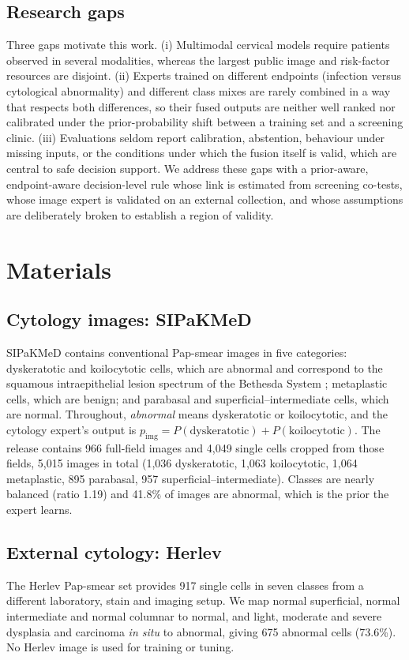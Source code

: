 \documentclass[lettersize,journal]{IEEEtran}
\newcommand{\pimg}{p_{\mathrm{img}}}
\begin{document}
\subsection{Research gaps}
Three gaps motivate this work. (i) Multimodal cervical models require patients observed in several modalities, whereas the largest public image and risk-factor resources are disjoint. (ii) Experts trained on different endpoints (infection versus cytological abnormality) and different class mixes are rarely combined in a way that respects both differences, so their fused outputs are neither well ranked nor calibrated under the prior-probability shift between a training set and a screening clinic. (iii) Evaluations seldom report calibration, abstention, behaviour under missing inputs, or the conditions under which the fusion itself is valid, which are central to safe decision support. We address these gaps with a prior-aware, endpoint-aware decision-level rule whose link is estimated from screening co-tests, whose image expert is validated on an external collection, and whose assumptions are deliberately broken to establish a region of validity.
\section{Materials}

\subsection{Cytology images: SIPaKMeD}
SIPaKMeD \cite{plissiti2018sipakmed} contains conventional Pap-smear images in five categories: dyskeratotic and koilocytotic cells, which are abnormal and correspond to the squamous intraepithelial lesion spectrum of the Bethesda System \cite{solomon2002bethesda}; metaplastic cells, which are benign; and parabasal and superficial--intermediate cells, which are normal. Throughout, \emph{abnormal} means dyskeratotic or koilocytotic, and the cytology expert's output is $\pimg=P(\text{dyskeratotic})+P(\text{koilocytotic})$. The release contains 966 full-field images and 4,049 single cells cropped from those fields, 5,015 images in total (1,036 dyskeratotic, 1,063 koilocytotic, 1,064 metaplastic, 895 parabasal, 957 superficial--intermediate). Classes are nearly balanced (ratio 1.19) and 41.8\% of images are abnormal, which is the prior the expert learns.

\subsection{External cytology: Herlev}
The Herlev Pap-smear set \cite{jantzen2005herlev} provides 917 single cells in seven classes from a different laboratory, stain and imaging setup. We map normal superficial, normal intermediate and normal columnar to normal, and light, moderate and severe dysplasia and carcinoma \emph{in situ} to abnormal, giving 675 abnormal cells (73.6\%). No Herlev image is used for training or tuning.
\end{document}
